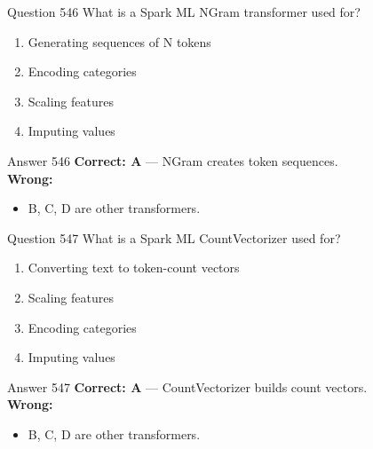\documentclass[aspectratio=169,11pt]{beamer}
\begin{document}
	\begin{frame}{Question 546}
		What is a Spark ML NGram transformer used for?
		\begin{enumerate}[label=\Alph*.]
			\item Generating sequences of N tokens
			\item Encoding categories
			\item Scaling features
			\item Imputing values
		\end{enumerate}
	\end{frame}
	\begin{frame}{Answer 546}
		\textbf{Correct: A} --- NGram creates token sequences.\\
		\vspace{0.5em}
		\textbf{Wrong:}
		\begin{itemize}
			\item B, C, D are other transformers.
		\end{itemize}
	\end{frame}
	
	\begin{frame}{Question 547}
		What is a Spark ML CountVectorizer used for?
		\begin{enumerate}[label=\Alph*.]
			\item Converting text to token-count vectors
			\item Scaling features
			\item Encoding categories
			\item Imputing values
		\end{enumerate}
	\end{frame}
	\begin{frame}{Answer 547}
		\textbf{Correct: A} --- CountVectorizer builds count vectors.\\
		\vspace{0.5em}
		\textbf{Wrong:}
		\begin{itemize}
			\item B, C, D are other transformers.
		\end{itemize}
	\end{frame}
	
\end{document}
